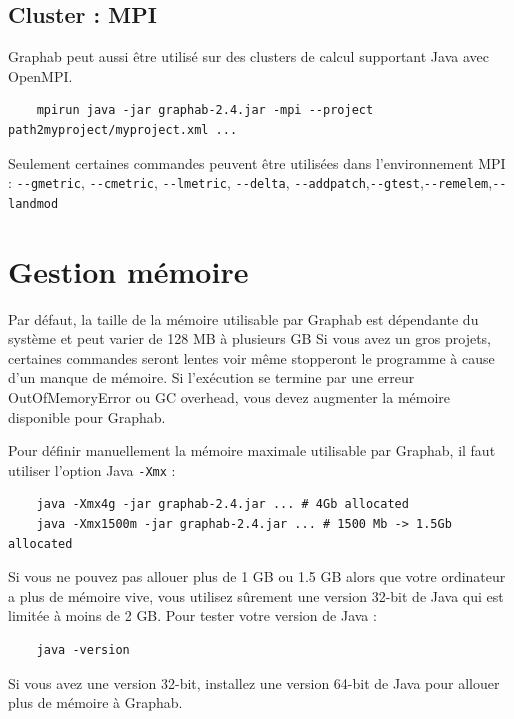 \documentclass[a4paper,10pt]{report}
\begin{document}
\subsection{Cluster : MPI}
Graphab peut aussi être utilisé sur des clusters de calcul supportant Java avec OpenMPI.
\begin{Verbatim}
	mpirun java -jar graphab-2.4.jar -mpi --project path2myproject/myproject.xml ...
\end{Verbatim}
Seulement certaines commandes peuvent être utilisées dans l'environnement MPI : \verb|--gmetric|, \verb|--cmetric|, \verb|--lmetric|, \verb|--delta|, \verb|--addpatch|,\verb|--gtest|,\verb|--remelem|,\verb|--landmod|

\section{Gestion mémoire}
Par défaut, la taille de la mémoire utilisable par Graphab est dépendante du système et peut varier de 128 MB à plusieurs GB
Si vous avez un gros projets, certaines commandes seront lentes voir même stopperont le programme à cause d'un manque de mémoire.
Si l'exécution se termine par une erreur OutOfMemoryError ou GC overhead, vous devez augmenter la mémoire disponible pour Graphab.

Pour définir manuellement la mémoire maximale utilisable par Graphab, il faut utiliser l'option Java \verb|-Xmx| :
\begin{Verbatim}
	java -Xmx4g -jar graphab-2.4.jar ... # 4Gb allocated
	java -Xmx1500m -jar graphab-2.4.jar ... # 1500 Mb -> 1.5Gb allocated
\end{Verbatim}
Si vous ne pouvez pas allouer plus de 1 GB ou 1.5 GB alors que votre ordinateur a plus de mémoire vive, vous utilisez sûrement une version 32-bit de Java qui est limitée à moins de 2 GB.
Pour tester votre version de Java :
\begin{Verbatim}
	java -version
\end{Verbatim}
Si vous avez une version 32-bit, installez une version 64-bit de Java pour allouer plus de mémoire à Graphab.




\end{document}
